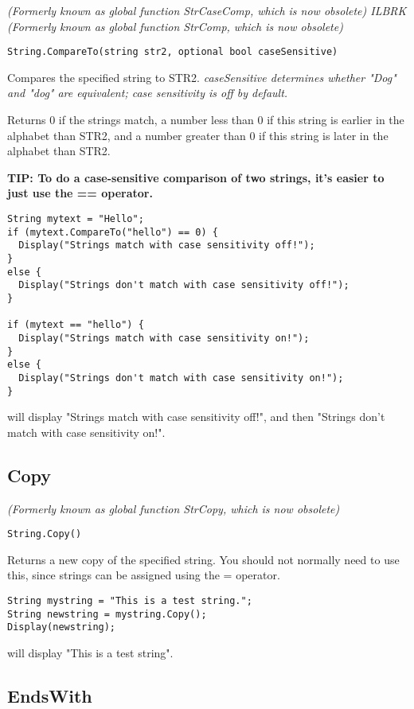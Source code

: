 \it{(Formerly known as global function StrCaseComp, which is now obsolete)} ILBRK
\it{(Formerly known as global function StrComp, which is now obsolete)}

\begin{verbatim}
String.CompareTo(string str2, optional bool caseSensitive)
\end{verbatim}
Compares the specified string to STR2. \it{caseSensitive} determines whether "Dog" and "dog"
are equivalent; case sensitivity is off by default.

Returns 0 if the strings match, a number less than 0 if this string is earlier in the alphabet than STR2,
and a number greater than 0 if this string is later in the alphabet than STR2.

\bf{TIP:} To do a case-sensitive comparison of two strings, it's easier to just use the == operator.

\begin{verbatim}
String mytext = "Hello";
if (mytext.CompareTo("hello") == 0) {
  Display("Strings match with case sensitivity off!");
}
else {
  Display("Strings don't match with case sensitivity off!");
}

if (mytext == "hello") {
  Display("Strings match with case sensitivity on!");
}
else {
  Display("Strings don't match with case sensitivity on!");
}
\end{verbatim}
will display "Strings match with case sensitivity off!", and then "Strings don't match with case sensitivity on!".


\subsection{Copy}\label{String.Copy}%

\it{(Formerly known as global function StrCopy, which is now obsolete)}

\begin{verbatim}
String.Copy()
\end{verbatim}
Returns a new copy of the specified string. You should not normally need to use this,
since strings can be assigned using the = operator.

\begin{verbatim}
String mystring = "This is a test string.";
String newstring = mystring.Copy();
Display(newstring);
\end{verbatim}
will display "This is a test string".


\subsection{EndsWith}\label{String.EndsWith}%

